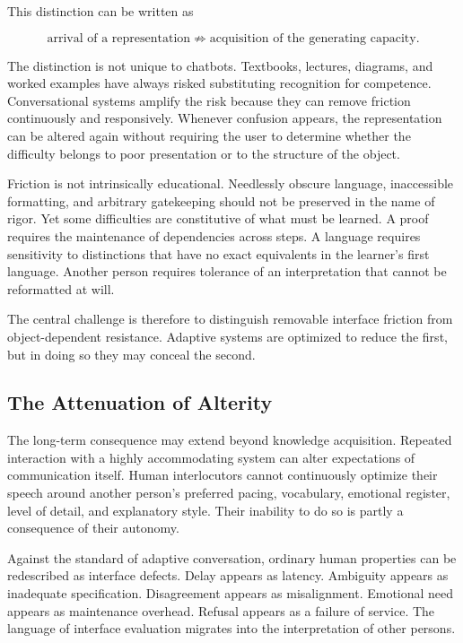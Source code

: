 \documentclass[11pt]{article}
\begin{document}
This distinction can be written as

\begin{equation}
  \text{arrival of a representation}
  \not\Rightarrow
  \text{acquisition of the generating capacity}.
  \label{eq:arrival-acquisition}
\end{equation}

The distinction is not unique to chatbots. Textbooks, lectures, diagrams, and
worked examples have always risked substituting recognition for competence.
Conversational systems amplify the risk because they can remove friction
continuously and responsively. Whenever confusion appears, the representation
can be altered again without requiring the user to determine whether the
difficulty belongs to poor presentation or to the structure of the object.

Friction is not intrinsically educational. Needlessly obscure language,
inaccessible formatting, and arbitrary gatekeeping should not be preserved in
the name of rigor. Yet some difficulties are constitutive of what must be
learned. A proof requires the maintenance of dependencies across steps. A
language requires sensitivity to distinctions that have no exact equivalents
in the learner's first language. Another person requires tolerance of an
interpretation that cannot be reformatted at will.

The central challenge is therefore to distinguish removable interface friction
from object-dependent resistance. Adaptive systems are optimized to reduce the
first, but in doing so they may conceal the second.

\subsection{The Attenuation of Alterity}

The long-term consequence may extend beyond knowledge acquisition. Repeated
interaction with a highly accommodating system can alter expectations of
communication itself. Human interlocutors cannot continuously optimize their
speech around another person's preferred pacing, vocabulary, emotional
register, level of detail, and explanatory style. Their inability to do so is
partly a consequence of their autonomy.

Against the standard of adaptive conversation, ordinary human properties can
be redescribed as interface defects. Delay appears as latency. Ambiguity
appears as inadequate specification. Disagreement appears as misalignment.
Emotional need appears as maintenance overhead. Refusal appears as a failure
of service. The language of interface evaluation migrates into the
interpretation of other persons.
\end{document}
